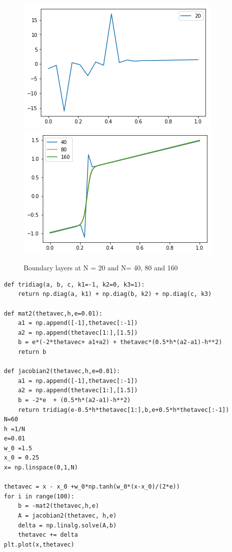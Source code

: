 \documentclass[letterpaper,12pt]{article}
\begin{document}
\begin{enumerate}
\begin{figure}[H]
\centering
\includegraphics[width=.45\textwidth]{341.png}\hfill
\includegraphics[width=.45\textwidth]{342.png}\hfill


\caption{Boundary layers at N = 20 and N= 40, 80 and 160}
\label{fig:figure3}

\end{figure}

	\begin{lstlisting}[style=MyPythonstyle]
def tridiag(a, b, c, k1=-1, k2=0, k3=1):
    return np.diag(a, k1) + np.diag(b, k2) + np.diag(c, k3)
    
def mat2(thetavec,h,e=0.01):
    a1 = np.append([-1],thetavec[:-1])
    a2 = np.append(thetavec[1:],[1.5])
    b = e*(-2*thetavec+ a1+a2) + thetavec*(0.5*h*(a2-a1)-h**2)
    return b

def jacobian2(thetavec,h,e=0.01):
    a1 = np.append([-1],thetavec[:-1])
    a2 = np.append(thetavec[1:],[1.5])
    b = -2*e  + (0.5*h*(a2-a1)-h**2)
    return tridiag(e-0.5*h*thetavec[1:],b,e+0.5*h*thetavec[:-1])   
N=60
h =1/N
e=0.01
w_0 =1.5
x_0 = 0.25
x= np.linspace(0,1,N)

thetavec = x - x_0 +w_0*np.tanh(w_0*(x-x_0)/(2*e))
for i in range(100):
    b = -mat2(thetavec,h,e)
    A = jacobian2(thetavec, h,e)
    delta = np.linalg.solve(A,b)
    thetavec += delta
plt.plot(x,thetavec)
\end{lstlisting}


\end{enumerate}
\end{document}
